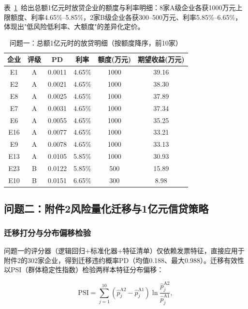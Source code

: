 \documentclass[12pt, a4paper]{article}
\begin{document}
表~\ref{tab:p1_detail}~给出总额1亿元时放贷企业的额度与利率明细：8家A级企业各获1000万元上限额度、利率4.65\%--5.85\%，2家B级企业各获300--500万元、利率5.85\%--6.65\%，体现出"低风险低利率、大额度"的差异化定价。

\begin{table}[H]
\centering
\caption{问题一：总额1亿元时的放贷明细（按额度降序，前10家）}
\label{tab:p1_detail}
{\small
\begin{tabular}{cccccc}
\toprule
\textbf{企业} & \textbf{评级} & \textbf{PD} & \textbf{利率} & \textbf{额度(万元)} & \textbf{期望收益(万元)} \\
\midrule
E1  & A & 0.0011 & 4.65\% & 1000 & 39.16 \\
E2  & A & 0.0021 & 4.65\% & 1000 & 38.30 \\
E8  & A & 0.0025 & 4.65\% & 1000 & 37.89 \\
E7  & A & 0.0031 & 4.65\% & 1000 & 37.34 \\
E6  & A & 0.0055 & 4.65\% & 1000 & 35.25 \\
E16 & A & 0.0077 & 4.65\% & 1000 & 33.21 \\
E9  & A & 0.0078 & 4.65\% & 1000 & 33.13 \\
E13 & A & 0.0105 & 5.85\% & 1000 & 30.93 \\
E23 & B & 0.0122 & 5.85\% & 500  & 15.89 \\
E10 & B & 0.0151 & 6.65\% & 300  & 8.98 \\
\bottomrule
\end{tabular}}
\end{table}

\subsection{问题二：附件2风险量化迁移与1亿元信贷策略}

\subsubsection{迁移打分与分布偏移检验}

问题一的评分器（逻辑回归+标准化器+特征清单）仅依赖发票特征，直接应用于附件2的302家企业，得到迁移违约概率PD（均值0.188、最大0.988）。迁移有效性以PSI（群体稳定性指数）检验两样本特征分布偏移：

\begin{equation}
    \text{PSI} = \sum_{j=1}^{10} \left(\hat{p}_j^{\text{A2}} - \hat{p}_j^{\text{A1}}\right)
    \ln\frac{\hat{p}_j^{\text{A2}}}{\hat{p}_j^{\text{A1}}},
    \label{eq:psi}
\end{equation}
\end{document}
